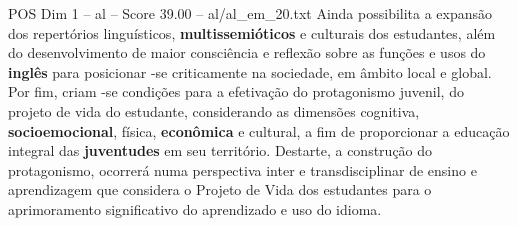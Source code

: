 \begin{textsample}{POS Dim 1 – al – Score 39.00 – al/al\_em\_20.txt}
Ainda possibilita a expansão dos repertórios linguísticos, \textbf{multissemióticos} e culturais dos estudantes, além do desenvolvimento de maior consciência e reflexão sobre as funções e usos do \textbf{inglês} para posicionar -se criticamente na sociedade, em âmbito local e global.
Por fim, criam -se condições para a efetivação do protagonismo juvenil, do projeto de vida do estudante, considerando as dimensões cognitiva, \textbf{socioemocional}, física, \textbf{econômica} e cultural, a fim de proporcionar a educação integral das \textbf{juventudes} em seu território.
Destarte, a construção do protagonismo, ocorrerá numa perspectiva inter e transdisciplinar de ensino e aprendizagem que considera o Projeto de Vida dos estudantes para o aprimoramento significativo do aprendizado e uso do idioma.

\end{textsample}
